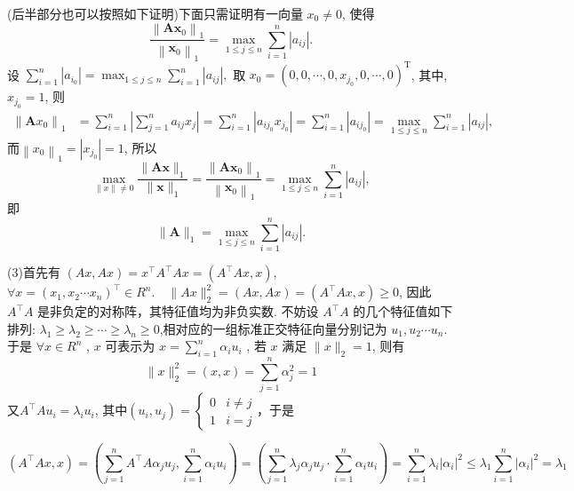 \begin{tcolorbox}
(后半部分也可以按照如下证明)下面只需证明有一向量 $ x_{0} \neq 0 $, 使得
$$
\frac{\left\|\boldsymbol{A} \boldsymbol{x}_{0}\right\|_{1}}{\left\|\boldsymbol{x}_{0}\right\|_{1}}=\max _{1 \leqslant j \leqslant n} \sum_{i=1}^{n}\left|a_{i j}\right| .
$$
设
$\displaystyle \sum_{i=1}^{n}\left|a_{i_{0}}\right|=\max _{1 \leqslant j \leqslant n} \sum_{i=1}^{n}\left|a_{i j}\right|,$
取 $ x_{0}=\left(0,0, \cdots, 0, x_{j_{0}}, 0, \cdots, 0\right)^{\mathrm{T}} $, 其中, $ x_{j_{0}}=1 $, 则
$$
\begin{aligned}
\left\|\boldsymbol{A} x_{0}\right\|_{1} & =\sum_{i=1}^{n}\left|\sum_{j=1}^{n} a_{i j} x_{j}\right|=\sum_{i=1}^{n}\left|a_{ij_{0}} x_{j_{0}}\right| =\sum_{i=1}^{n}\left|a_{i j_{0}}\right|=\max _{1 \leqslant j \leqslant n} \sum_{i=1}^{n}\left|a_{i j}\right|,
\end{aligned}
$$
而$\displaystyle \left\|x_{0}\right\|_{1}=\left|x_{j_{0}}\right|=1$,
所以
$$
\max _{\|x\| \neq 0} \frac{\|\boldsymbol{A} \boldsymbol{x}\|_{1}}{\|\boldsymbol{x}\|_{1}}=\frac{\left\|\boldsymbol{A} \boldsymbol{x}_{0}\right\|_{1}}{\left\|\boldsymbol{x}_{0}\right\|_{1}}=\max _{1 \leqslant j \leqslant n} \sum_{i=1}^{n}\left|a_{i j}\right|,
$$
即
$$
\|\boldsymbol{A}\|_{1}=\max _{1\leqslant j \leqslant n} \sum_{i=1}^{n}\left|a_{i j}\right| .
$$
\end{tcolorbox}


(3)首先有 $(A x, A x)=x^{\top} A^{\top} A x=\left(A^{\top} A x, x\right)$, $\forall x=\left(x_{1}, x_{2} \cdots x_{n}\right)^{\top} \in R^{n} . \quad\|A x\|_{2}^{2}=(A x, A x)=\left(A^{\top} A x, x\right) \geqslant 0$,  因此 $ A^{\top} A $ 是非负定的对称阵，其特征值均为非负实数.
不妨设 $ A^{\top} A $ 的几个特征值如下排列: $ \lambda_{1} \geqslant \lambda_{2} \geqslant \cdots \geqslant \lambda_{n} \geqslant 0 $,相对应的一组标准正交特征向量分别记为 $ u_{1}, u_{2} \cdots u_{n} $. 于是 $ \forall x \in R^{n}$ , $x $ 可表示为 $ x=\sum\limits_{i=1}^{n} \alpha_{i} u_{i} $ , 若 $x$ 满足 $ \|x\|_{2}=1 $, 则有
$$
\|x\|_{2}^{2}=(x, x)=\sum_{j=1}^{n} \alpha_{j}^{2}=1 $$
又$A^{\top} A u_{i}=\lambda_{i} u_{i}$, 其中$\left(u_{i}, u_{j}\right)=\left\{\begin{array}{ll}
0 & i \neq j \\
1 & i=j
\end{array}\right. $，于是

$$\left(A^{\top} A x, x\right)=\left(\sum_{j=1}^{n} A^{\top} A \alpha_{j} u_{j}, \sum_{i=1}^{n} \alpha_{i} u_{i}\right) 
=\left(\sum_{j=1}^{n} \lambda_{j} \alpha_{j} u_{j} \cdot \sum_{i=1}^{n} \alpha_{i} u_{i}\right) 
=\sum_{i=1}^{n} \lambda_{i}\left|\alpha_{i}\right|^{2} \leqslant \lambda_{1} \sum_{i=1}^{n}\left|\alpha_{i}\right|^{2}=\lambda_{1} 
$$

